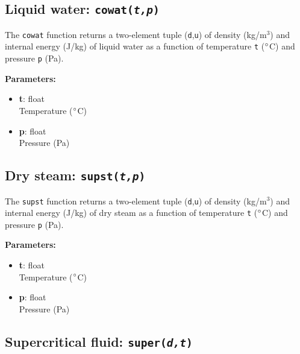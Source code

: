 \begin{snugshade}
\subsection{Liquid water: \texttt{cowat(\emph{t,p})}}
\end{snugshade}
\label{sec:iapws97:cowat}

The \texttt{cowat} function returns a two-element tuple (\texttt{d},\texttt{u}) of density (kg/m$^3$) and internal energy (J/kg) of liquid water as a function of temperature \texttt{t} ($\degree$C) and pressure \texttt{p} (Pa).

\textbf{Parameters:}
\begin{itemize}
\item \textbf{t}: float\\
  Temperature ($\degree$C)
\item \textbf{p}: float\\
  Pressure (Pa)
\end{itemize}

\begin{snugshade}
\subsection{Dry steam: \texttt{supst(\emph{t,p})}}
\end{snugshade}
\label{sec:iapws97:supst}

The \texttt{supst} function returns a two-element tuple (\texttt{d},\texttt{u}) of density (kg/m$^3$) and internal energy (J/kg) of dry steam as a function of temperature \texttt{t} ($\degree$C) and pressure \texttt{p} (Pa).

\textbf{Parameters:}
\begin{itemize}
\item \textbf{t}: float\\
  Temperature ($\degree$C)
\item \textbf{p}: float\\
  Pressure (Pa)
\end{itemize}

\begin{snugshade}
\subsection{Supercritical fluid: \texttt{super(\emph{d,t})}}
\end{snugshade}
\label{sec:iapws97:super}

